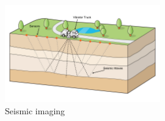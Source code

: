 \begin{figure}[!h]
\centering 
\includegraphics[width=0.6\textwidth]{images/geophones.jpg}
\caption{Seismic imaging}
\label{geophones} 
\end{figure}

